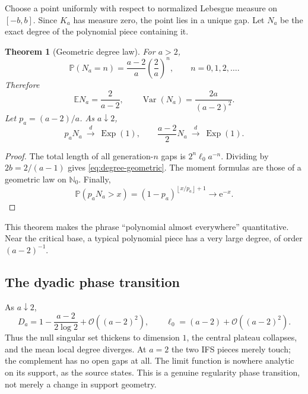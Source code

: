 \documentclass[11pt,oneside]{article}
\newtheorem{theorem}{Theorem}[section]
\theoremstyle{definition}
\theoremstyle{remark}
\newcommand{\N}{\mathbb N}
\newcommand{\e}{\mathrm e}
\newcommand{\Var}{\operatorname{Var}}
\newcommand{\E}{\mathbb E}
\newcommand{\Prob}{\mathbb P}
\newcommand{\bigO}{\mathcal O}
\newcommand{\floor}[1]{\left\lfloor #1\right\rfloor}
\begin{document}
Choose a point uniformly with respect to normalized Lebesgue measure on $[-b,b]$.
Since $K_a$ has measure zero, the point lies in a unique gap.  Let $N_a$ be the exact degree
of the polynomial piece containing it.

\begin{theorem}[Geometric degree law]
\label{thm:degree-law}
For $a>2$,
\begin{equation}
 \Prob(N_a=n)=\frac{a-2}{a}\left(\frac2a\right)^n,
 \qquad n=0,1,2,\ldots.
 \label{eq:degree-geometric}
\end{equation}
Therefore
\begin{equation}
 \E N_a=\frac2{a-2},
 \qquad
 \Var(N_a)=\frac{2a}{(a-2)^2}.
 \label{eq:degree-moments}
\end{equation}
Let $p_a=(a-2)/a$.  As $a\downarrow2$,
\begin{equation}
 p_aN_a\ \xrightarrow{\ d\ }\ \operatorname{Exp}(1),
 \qquad
 \frac{a-2}{2}N_a\ \xrightarrow{\ d\ }\ \operatorname{Exp}(1).
 \label{eq:degree-critical-limit}
\end{equation}
\end{theorem}

\begin{proof}
The total length of all generation-$n$ gaps is $2^n\ell_0a^{-n}$.  Dividing by
$2b=2/(a-1)$ gives \eqref{eq:degree-geometric}.  The moment formulas are those of a
geometric law on $\N_0$.  Finally,
\[
 \Prob(p_aN_a>x)=(1-p_a)^{\floor{x/p_a}+1}\longrightarrow\e^{-x}.
\]
\end{proof}

This theorem makes the phrase ``polynomial almost everywhere'' quantitative.  Near the
critical base, a typical polynomial piece has a very large degree, of order $(a-2)^{-1}$.

\subsection{The dyadic phase transition}

As $a\downarrow2$,
\begin{equation}
 D_a=1-\frac{a-2}{2\log2}+\bigO((a-2)^2),
 \qquad
 \ell_0=(a-2)+\bigO((a-2)^2).
 \label{eq:critical-expansions}
\end{equation}
Thus the null singular set thickens to dimension $1$, the central plateau collapses, and the
mean local degree diverges.  At $a=2$ the two IFS pieces merely touch; the complement has no
open gaps at all.  The limit function is nowhere analytic on its support, as the source states.
This is a genuine regularity phase transition, not merely a change in support geometry.
\end{document}

